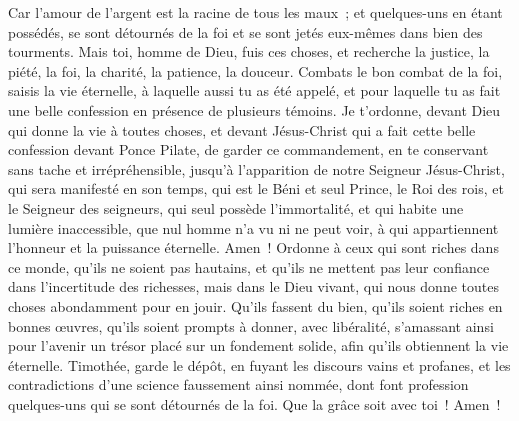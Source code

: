 \begin{multicols}{2}
Car l'amour de l'argent est la racine de tous les maux~; et quelques-uns en étant possédés, se sont détournés de la foi et se sont jetés eux-mêmes dans bien des tourments.
Mais toi, homme de Dieu, fuis ces choses, et recherche la justice, la piété, la foi, la charité, la patience, la douceur.
Combats le bon combat de la foi, saisis la vie éternelle, à laquelle aussi tu as été appelé, et pour laquelle tu as fait une belle confession en présence de plusieurs témoins.
Je t'ordonne, devant Dieu qui donne la vie à toutes choses, et devant Jésus-Christ qui a fait cette belle confession devant Ponce Pilate,
de garder ce commandement, en te conservant sans tache et irrépréhensible, jusqu'à l'apparition de notre Seigneur Jésus-Christ,
qui sera manifesté en son temps, qui est le Béni et seul Prince, le Roi des rois, et le Seigneur des seigneurs,
qui seul possède l'immortalité, et qui habite une lumière inaccessible, que nul homme n'a vu ni ne peut voir, à qui appartiennent l'honneur et la puissance éternelle. Amen~!
Ordonne à ceux qui sont riches dans ce monde, qu'ils ne soient pas hautains, et qu'ils ne mettent pas leur confiance dans l'incertitude des richesses, mais dans le Dieu vivant, qui nous donne toutes choses abondamment pour en jouir.
Qu'ils fassent du bien, qu'ils soient riches en bonnes œuvres, qu'ils soient prompts à donner, avec libéralité,
s'amassant ainsi pour l'avenir un trésor placé sur un fondement solide, afin qu'ils obtiennent la vie éternelle.
Timothée, garde le dépôt, en fuyant les discours vains et profanes, et les contradictions d'une science faussement ainsi nommée,
dont font profession quelques-uns qui se sont détournés de la foi. Que la grâce soit avec toi~! Amen~!
\PPE{}
\end{multicols}
